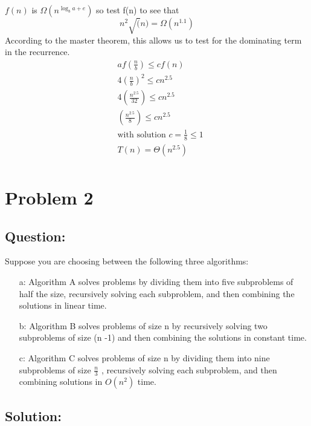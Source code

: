 \documentclass[12pt]{article}
\begin{document}
\begin{itemize}
        $f(n)$ is $\Omega(n^{\log_ba+e})$ so test f(n) to see that $$ n^2\sqrt(n) = \Omega(n^{1.1})$$
        According to the master theorem, this allows us to test for the dominating term in the recurrence. 
        \begin{equation}
          \begin{aligned}
            & af(\frac{n}{b}) \le cf(n) \\
            & 4(\frac{n}{b})^2 \le cn^{2.5} \\
            & 4(\frac{n^{2.5}}{32}) \le cn^{2.5} \\
            & (\frac{n^{2.5}}{8}) \le cn^{2.5} \\
            & \text{with solution $c = \frac{1}{8} \le 1$} \\
            & T(n) = \Theta(n^{2.5}) \\
          \end{aligned}
        \end{equation}
    \end{itemize}
\pagebreak

\section{Problem 2}

    \subsection{Question:} 

      Suppose you are choosing between the following three algorithms:
      \begin{itemize}
        \item[a:] Algorithm A solves problems by dividing them into five subproblems of half the size, recursively solving each subproblem, and then combining the solutions in linear time.
        \item[b:] Algorithm B solves problems of size n by recursively solving two subproblems of size (n -1) and then combining the solutions in constant time.
        \item[c:] Algorithm C solves problems of size n by dividing them into nine subproblems of size $\frac{n}{3}$ , recursively solving each subproblem, and then combining solutions in $O(n^2)$ time.
      \end{itemize}

    \subsection{Solution:}
\end{document}
